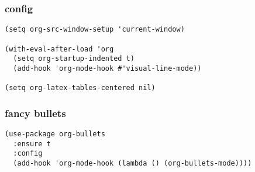\documentclass[11pt]{article}
\begin{document}
\subsubsection{config}
\label{sec:orge194d49}
\begin{verbatim}
(setq org-src-window-setup 'current-window)

(with-eval-after-load 'org
  (setq org-startup-indented t)
  (add-hook 'org-mode-hook #'visual-line-mode))

(setq org-latex-tables-centered nil)
\end{verbatim}
\subsubsection{fancy bullets}
\label{sec:orge8dbfb7}
\begin{verbatim}
(use-package org-bullets
  :ensure t
  :config
  (add-hook 'org-mode-hook (lambda () (org-bullets-mode))))
\end{verbatim}
\end{document}
